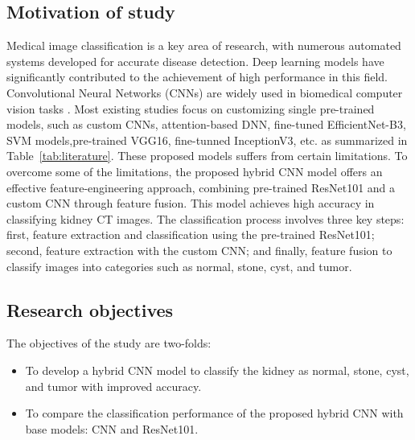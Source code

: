 \subsection{Motivation of study}
Medical image classification is a key area of research, with numerous automated systems developed for accurate disease detection. Deep learning models have significantly contributed to the achievement of high performance in this field. Convolutional Neural Networks (CNNs) are widely used in biomedical computer vision tasks \citep{krizhevsky2012imagenet}. Most existing studies focus on customizing single pre-trained models, such as custom CNNs, attention-based DNN, fine-tuned EfficientNet-B3, SVM models,pre-trained VGG16, fine-tunned InceptionV3, etc. as summarized in Table~\ref{tab:literature}. These proposed models suffers from certain limitations. To overcome some of the limitations, the proposed hybrid CNN model offers an effective feature-engineering approach, combining pre-trained ResNet101 and a custom CNN through feature fusion. This model achieves high accuracy in classifying kidney CT images. The classification process involves three key steps: first, feature extraction and classification using the pre-trained ResNet101; second, feature extraction with the custom CNN; and finally, feature fusion to classify images into categories such as normal, stone, cyst, and tumor.
\subsection{Research objectives}
The objectives of the study are two-folds:

\begin{itemize}
    \item To develop a hybrid CNN model to classify the kidney as normal, stone, cyst, and tumor with improved accuracy.
    \item To compare the classification performance of the proposed hybrid CNN with base models: CNN and ResNet101. 
\end{itemize}

